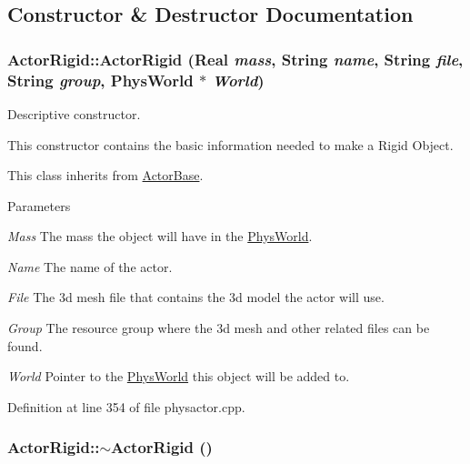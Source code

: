 \subsection{Constructor \& Destructor Documentation}
\hypertarget{classActorRigid_a99b5b801a7462e987b8dd4437155b9d1}{
\subsubsection[{ActorRigid}]{\setlength{\rightskip}{0pt plus 5cm}ActorRigid::ActorRigid (Real {\em mass}, \/  String {\em name}, \/  String {\em file}, \/  String {\em group}, \/  {\bf PhysWorld} $\ast$ {\em World})}}
\label{d5/d10/classActorRigid_a99b5b801a7462e987b8dd4437155b9d1}


Descriptive constructor. 

This constructor contains the basic information needed to make a Rigid Object. \par
 This class inherits from \hyperlink{classActorBase}{ActorBase}. 
\begin{DoxyParams}{Parameters}
\item[{\em Mass}]The mass the object will have in the \hyperlink{classPhysWorld}{PhysWorld}. \item[{\em Name}]The name of the actor. \item[{\em File}]The 3d mesh file that contains the 3d model the actor will use. \item[{\em Group}]The resource group where the 3d mesh and other related files can be found. \item[{\em World}]Pointer to the \hyperlink{classPhysWorld}{PhysWorld} this object will be added to. \end{DoxyParams}


Definition at line 354 of file physactor.cpp.

\hypertarget{classActorRigid_a36b9eb18fc9e83769a48eb1c34312889}{
\subsubsection[{$\sim$ActorRigid}]{\setlength{\rightskip}{0pt plus 5cm}ActorRigid::$\sim$ActorRigid ()}}
\label{d5/d10/classActorRigid_a36b9eb18fc9e83769a48eb1c34312889}


